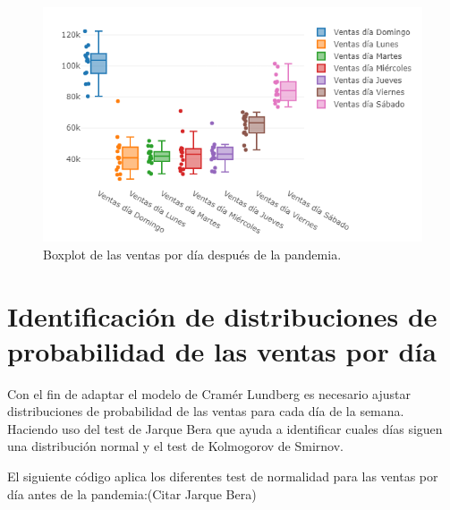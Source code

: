 \documentclass[
  us-letterpaper,
]{scrreprt}
\newenvironment{Shaded}{\begin{snugshade}}{\end{snugshade}}
\newcommand{\CommentTok}[1]{\textcolor[rgb]{0.37,0.37,0.37}{#1}}
\newcommand{\FunctionTok}[1]{\textcolor[rgb]{0.28,0.35,0.67}{#1}}
\newcommand{\NormalTok}[1]{\textcolor[rgb]{0.00,0.23,0.31}{#1}}
\newcommand{\SpecialCharTok}[1]{\textcolor[rgb]{0.37,0.37,0.37}{#1}}
\theoremstyle{plain}
\theoremstyle{plain}
\theoremstyle{definition}
\theoremstyle{remark}
\begin{document}
\begin{figure}[H]

{\centering \includegraphics{fig-box2pdf.png}

}

\caption{Boxplot de las ventas por día después de la pandemia.}

\end{figure}%

\section{Identificación de distribuciones de probabilidad de las ventas
por
día}\label{identificaciuxf3n-de-distribuciones-de-probabilidad-de-las-ventas-por-duxeda}

Con el fin de adaptar el modelo de Cramér Lundberg es necesario ajustar
distribuciones de probabilidad de las ventas para cada día de la semana.
Haciendo uso del test de Jarque Bera que ayuda a identificar cuales días
siguen una distribución normal y el test de Kolmogorov de Smirnov.

El siguiente código aplica los diferentes test de normalidad para las
ventas por día antes de la pandemia:(Citar Jarque Bera)

\begin{Shaded}
\end{Shaded}
\end{document}
